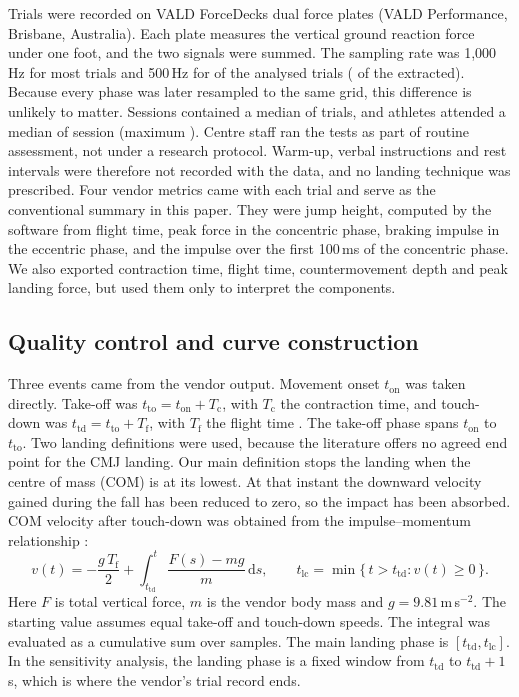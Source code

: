 Trials were recorded on VALD ForceDecks dual force plates (VALD Performance, Brisbane, Australia). Each plate measures the vertical ground reaction force under one foot, and the two signals were summed. The sampling rate was 1,000\,Hz for most trials and 500\,Hz for \nFsLowAnalysed{} of the \nTrials{} analysed trials (\nFsLow{} of the \nTrialsAll{} extracted). Because every phase was later resampled to the same grid, this difference is unlikely to matter. Sessions contained a median of \trialsPerSessMedian{} trials, and athletes attended a median of \sessPerAthMedian{} session (maximum \sessPerAthMax). Centre staff ran the tests as part of routine assessment, not under a research protocol. Warm-up, verbal instructions and rest intervals were therefore not recorded with the data, and no landing technique was prescribed. Four vendor metrics came with each trial and serve as the conventional summary in this paper. They were jump height, computed by the software from flight time, peak force in the concentric phase, braking impulse in the eccentric phase, and the impulse over the first 100\,ms of the concentric phase. We also exported contraction time, flight time, countermovement depth and peak landing force, but used them only to interpret the components.

\subsection{Quality control and curve construction}
\label{sec:curves}

Three events came from the vendor output. Movement onset $t_{\mathrm{on}}$ was taken directly. Take-off was $t_{\mathrm{to}} = t_{\mathrm{on}} + T_{\mathrm{c}}$, with $T_{\mathrm{c}}$ the contraction time, and touch-down was $t_{\mathrm{td}} = t_{\mathrm{to}} + T_{\mathrm{f}}$, with $T_{\mathrm{f}}$ the flight time \parencite{owen2014,mcmahon2018,harry2020}. The take-off phase spans $t_{\mathrm{on}}$ to $t_{\mathrm{to}}$. Two landing definitions were used, because the literature offers no agreed end point for the CMJ landing. Our main definition stops the landing when the centre of mass (COM) is at its lowest. At that instant the downward velocity gained during the fall has been reduced to zero, so the impact has been absorbed. COM velocity after touch-down was obtained from the impulse--momentum relationship \parencite{linthorne2001,street2001}:
\begin{equation}
v(t) = -\frac{g\,T_{\mathrm{f}}}{2} + \int_{t_{\mathrm{td}}}^{t} \frac{F(s) - m g}{m}\,\mathrm{d}s,
\qquad
t_{\mathrm{lc}} = \min\{\, t > t_{\mathrm{td}} : v(t) \ge 0 \,\}.
\label{eq:velocity}
\end{equation}
Here $F$ is total vertical force, $m$ is the vendor body mass and $g = 9.81$\,m\,s$^{-2}$. The starting value assumes equal take-off and touch-down speeds. The integral was evaluated as a cumulative sum over samples. The main landing phase is $[t_{\mathrm{td}}, t_{\mathrm{lc}}]$. In the sensitivity analysis, the landing phase is a fixed window from $t_{\mathrm{td}}$ to $t_{\mathrm{td}} + 1$\,s, which is where the vendor's trial record ends.

